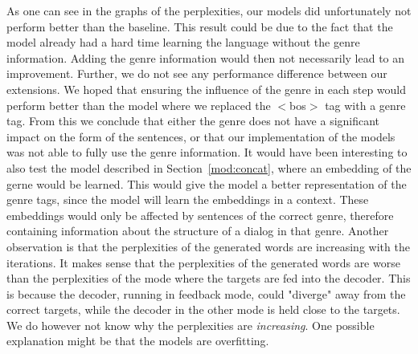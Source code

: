 As one can see in the graphs of the perplexities, our models did unfortunately not perform better than the baseline.
%
This result could be due to the fact that the model already had a hard time learning the language without the genre information. Adding the genre information would then not necessarily lead to an improvement.
%
Further, we do not see any performance difference between our extensions. We hoped that ensuring the influence of the genre in each step would perform better than the model where we replaced the $<$bos$>$ tag with a genre tag.
%
From this we conclude that either the genre does not have a significant impact on the form of the sentences, or that our implementation of the models was not able to fully use the genre information.
%
It would have been interesting to also test the model described in Section~\ref{mod:concat}, where an embedding of the gerne would be learned.
%
This would give the model a better representation of the genre tags, since the model will learn the embeddings in a context. These embeddings would only be affected by sentences of the correct genre, therefore containing information about the structure of a dialog in that genre.
%
\newline
%
Another observation is that the perplexities of the generated words are increasing with the iterations.
%
It makes sense that the perplexities of the generated words are worse than the perplexities of the mode where the targets are fed into the decoder. This is because the decoder, running in feedback mode, could "diverge" away from the correct targets, while the decoder in the other mode is held close to the targets. We do however not know why the perplexities are \emph{increasing}.
%
One possible explanation might be that the models are overfitting.